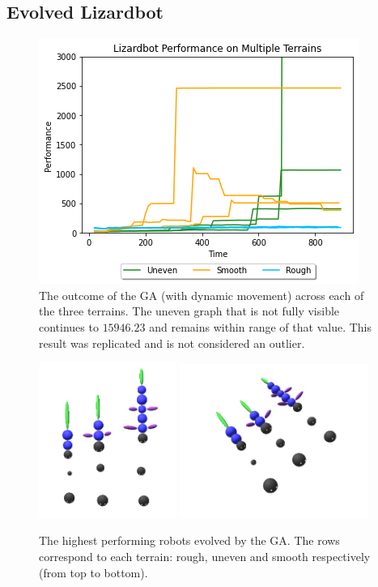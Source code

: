 \documentclass{article}
\begin{document}
\subsection{Evolved Lizardbot}
\label{sec:Robot Res}
\begin{figure}[H]
\centering
\includegraphics[scale=0.8]{multipleTerrains}
\caption{The outcome of the GA (with dynamic movement) across each of the three terrains. The uneven graph that is not fully visible continues to $15946.23$ and remains within range of that value. This result was replicated and is not considered an outlier.}
\end{figure}

\begin{figure}[H]
\centering
\includegraphics[width=0.4\textwidth]{best-above}
\includegraphics[width=0.55\textwidth]{best-side}
\caption{The highest performing robots evolved by the GA. The rows correspond to each terrain: rough, uneven and smooth respectively (from top to bottom).}
\end{figure}
\end{document}

